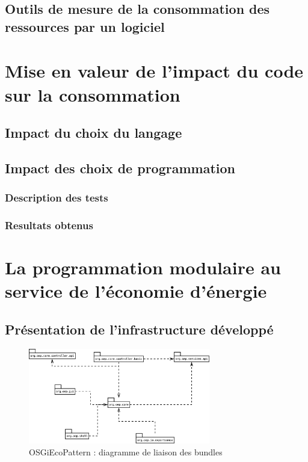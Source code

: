 \documentclass[a4paper, 11pt]{report}
\begin{document}
	\section{Outils de mesure de la consommation des ressources par un logiciel}

\chapter{Mise en valeur de l'impact du code sur la consommation}
	\section{Impact du choix du langage}
	\section{Impact des choix de programmation}
		\subsection{Description des tests}
		\subsection{Resultats obtenus}

\chapter{La programmation modulaire au service de l'économie d'énergie}
	\section{Présentation de l'infrastructure développé}
\begin{figure}
	\begin{center}
		\includegraphics[width=300px]{figures/EcoPattern_Bundle_Diagramme.eps}
		\caption{OSGiEcoPattern : diagramme de liaison des bundles}
	\end{center}
\end{figure}
\end{document}
